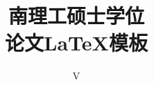 \classification{}
\confidential{}
\UDC{}
\title[南理工硕士学位论文\LaTeX{}模板]{南理工硕士学位\\论文\LaTeX{}模板}
\author{V}
\coadvisor{}
\coadvisortitle{}
\interest{}
\maketitle
\makeatletter
	\thispagestyle{empty}
	\begin{center}
		
	\end{center}
\makeatother
